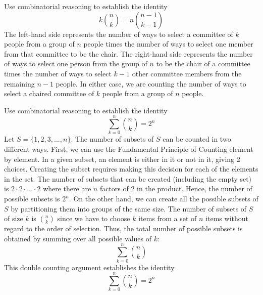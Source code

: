 \documentclass[handout]{ximera}
\begin{document}
\begin{example}[example 3]
Use combinatorial reasoning to establish the identity
\[
k \binom{n}{k} = n\binom{n-1}{k-1}
\]
The left-hand side represents the number of ways to select a committee of $k$ people from a group 
of $n$ people times the number of ways to select one member from that committee to be the chair. 
The right-hand side represents the number of ways to select one person from the group of $n$ to be the 
chair of a committee times the number of ways to select $k-1$ other committee members from 
the remaining $n-1$ people.  In either case, we are counting the number of ways to select 
a chaired committee of $k$ people from a group of $n$ people.
\end{example}



\begin{example}[example 4]
Use combinatorial reasoning to establish the identity
\[
\sum_{k=0}^n \binom{n}{k} = 2^n
\]
Let $S = \{1,2,3,...,n\}$. The number of subsets of $S$ can be counted in two different ways.
First, we can use the Fundamental Principle of Counting element by element. 
In a given subset, an element is either in it or not in it, giving 2 choices. 
Creating the subset requires making this decision for each of the elements in the set. 
The number of subsets that can be created (including the empty set) 
is $2 \cdot 2 \cdot \ldots \cdot 2$ where there are $n$ factors of $2$ in the product.  
Hence, the number of possible subsets is $2^n$.
On the other hand, we can create all the possible subsets of $S$ by partitioning them 
into groups of the same size.
The number of subsets of $S$ of size $k$ is $\binom{n}{k}$ since we have to choose $k$ items from a 
set of $n$ items without regard to the order of selection. Thus, the total number of possible 
subsets is obtained by summing over all possible values of $k$:
\[
\sum_{k=0}^n \binom{n}{k}
\]
This double counting argument establishes the identity
\[
\sum_{k=0}^n \binom{n}{k} = 2^n
\]

\end{example}
\end{document}
